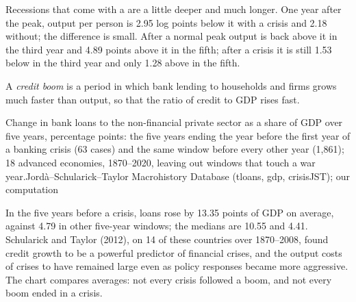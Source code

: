 Recessions that come with a  are a little deeper and much longer. One year after the peak, output per person is 2.95
log points below it with a crisis and 2.18 without; the difference is small. After a normal peak output is back above it
in the third year and 4.89 points above it in the fifth; after a crisis it is still 1.53 below in the third year and only
1.28 above in the fifth.

\begin{definition}\label{def:b2:banks-and-crises:credit-boom}
A \emph{credit boom} is a period in which bank lending to households and firms grows much faster than
output, so that the ratio of credit to GDP rises fast.
\end{definition}

\begin{omchart}{Change in bank loans to the non-financial private sector as a share of GDP over five years, percentage
  points: the five years ending the year before the first year of a banking crisis (63 cases) and the same window before
  every other year (1,861); 18 advanced economies, 1870--2020, leaving out windows that touch a war year.}{Jord\`a--Schularick--Taylor Macrohistory Database (tloans, gdp,
  crisisJST); our computation}
\end{omchart}

In the five years before a crisis, loans rose by 13.35 points of GDP on average, against 4.79 in other five-year windows;
the medians are 10.55 and 4.41. Schularick and Taylor (2012), on 14 of these countries over 1870--2008, found credit growth
to be a powerful predictor of financial crises, and the output costs of crises to have remained large even as policy
responses became more aggressive. The chart compares averages: not every crisis followed a boom, and not every boom ended
in a crisis.

